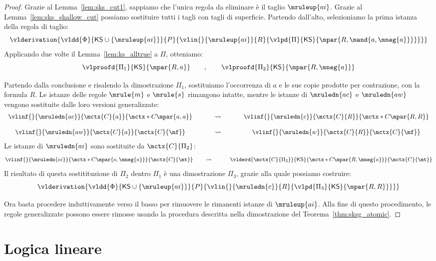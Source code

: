 \documentclass[12pt,a4paper,openright,twoside]{report}
\begin{document}
\begin{proof}
Grazie al Lemma~\ref{lem:sks_cut1}, sappiamo che l'unica regola da eliminare \`e il taglio $\mruleup{ai}$. Grazie al Lemma~\ref{lem:sks_shallow_cut} possiamo sostituire tutti i tagli con tagli di superficie. Partendo dall'alto, selezioniamo la prima istanza della regola di taglio:
$$
	\vlderivation{
		\vldd{\Phi}{\mathsf{KS} \cup \{\mruleup{ai}\}}{P}{
			\vlin{}{\mruleup{ai}}{R}{
				\vlpd{\Pi}{\mathsf{KS}}{\mpar{R, \mand{a, \mneg{a}}}}
			}
		}
	}
$$
Applicando due volte il Lemma~\ref{lem:ks_alltrue} a $\Pi$, otteniamo:
$$
	\vlproofd{\Pi_1}{\mathsf{KS}}{\mpar{R, a}}
	\qquad,\qquad
	\vlproofd{\Pi_2}{\mathsf{KS}}{\mpar{R, \mneg{a}}}
$$

Partendo dalla conclusione e risalendo la dimostrazione $\Pi_1$, sostituiamo l'occorrenza di $a$ e le sue copie prodotte per contrazione, con la formula $R$. Le istanze delle regole $\mrule{m}$ e $\mrule{s}$ rimangono intatte, mentre le istanze di $\mruledn{ac}$ e $\mruledn{aw}$ vengono sostituite dalle loro versioni generalizzate:
$$
\begin{array}{ccc}
	\vlinf{}{\mruledn{ac}}{\mctx{C}{a}}{\mctx*{C}\mpar{a,a}} & \rightsquigarrow & \vlinf{}{\mruledn{c}}{\mctx{C}{R}}{\mctx*{C}\mpar{R,R}} \\
	~ & \qquad\qquad\qquad & ~ \\
	\vlinf{}{\mruledn{aw}}{\mctx{C}{a}}{\mctx{C}{\mf}} & \rightsquigarrow & \vlinf{}{\mruledn{w}}{\mctx{C}{R}}{\mctx{C}{\mf}}
\end{array}
$$
Le istanze di $\mruledn{ai}$ sono sostituite da $\mctx{C}{\Pi_2}$:
$$
	\vlinf{}{\mruledn{ai}}{\mctx*{C}\mpar{a, \mneg{a}}}{\mctx{C}{\mt}}
	\quad\quad\rightsquigarrow\quad\quad\quad
	\vlderd{\mctx{C}{\Pi_2}}{\mathsf{KS}}{\mctx*{C}\mpar{R, \mneg{a}}}{\mctx{C}{\mt}}
$$
Il risultato di questa sostitituzione di $\Pi_2$ dentro $\Pi_1$ \`e una dimostrazione $\Pi_3$, grazie alla quale possiamo costruire:
$$
	\vlderivation{
		\vldd{\Phi}{\mathsf{KS} \cup \{\mruleup{ai}\}}{P}{
			\vlin{}{\mruledn{c}}{R}{
				\vlpd{\Pi_3}{\mathsf{KS}}{\mpar{R, R}}
			}
		}
	}
$$

Ora basta procedere induttivamente verso il basso per rimuovere le rimanenti istanze di $\mruleup{ai}$. Alla fine di questo procedimento, le regole generalizzate possono essere rimosse usando la procedura descritta nella dimostrazione del Teorema~\ref{thm:sksg_atomic}.
\end{proof}


\chapter{Logica lineare}
\end{document}
